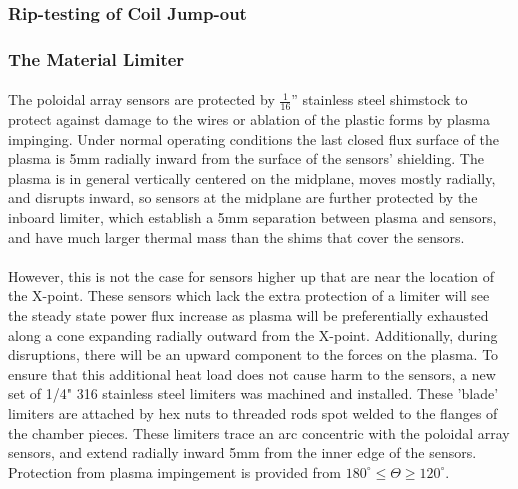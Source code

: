 \subsubsection{Rip-testing of Coil Jump-out}
 
\subsubsection{The Material Limiter}
\paragraph{}The poloidal array sensors are protected by $\frac{1}{16}$'' stainless steel shimstock to protect against damage to the wires or ablation of the plastic forms by plasma impinging.  Under normal operating conditions the last closed flux surface of the plasma is 5mm radially inward from the surface of the sensors' shielding.  The plasma is in general vertically centered on the midplane, moves mostly radially, and disrupts inward, so sensors at the midplane are further protected by the inboard limiter, which establish a 5mm separation between plasma and sensors, and have much larger thermal mass than the shims that cover the sensors.
\paragraph{}However, this is not the case for sensors higher up that are near the location of the X-point.  These sensors which lack the extra protection of a limiter will see the steady state power flux increase as plasma will be preferentially exhausted along a cone expanding radially outward from the X-point.  Additionally, during disruptions, there will be an upward component to the forces on the plasma.  To ensure that this additional heat load does not cause harm to the sensors, a new set of 1/4" 316 stainless steel limiters was machined and installed.  These 'blade' limiters are attached by hex nuts to threaded rods spot welded to the flanges of the chamber pieces.  These limiters trace an arc concentric with the poloidal array sensors, and extend radially inward 5mm from the inner edge of the sensors.  Protection from plasma impingement is provided from $180^{\circ} \leq \Theta \geq 120^{\circ}$.

